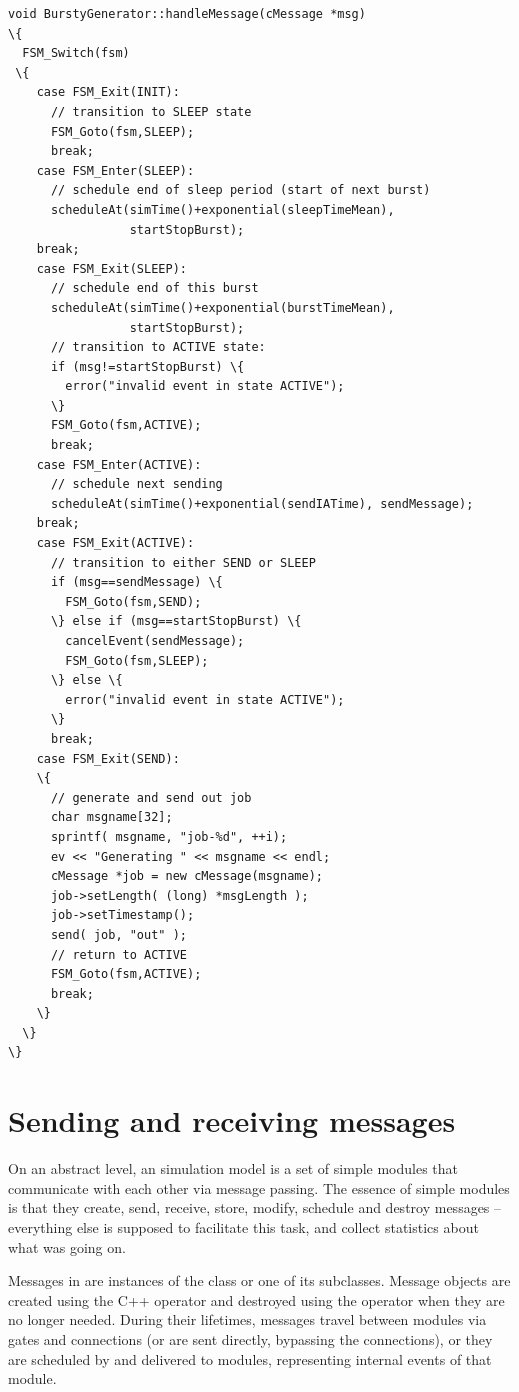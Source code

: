 \begin{Verbatim}[commandchars=\\\{\}]
void BurstyGenerator::handleMessage(cMessage *msg)
\{
  FSM_Switch(fsm)
 \{
    case FSM_Exit(INIT):
      // transition to SLEEP state
      FSM_Goto(fsm,SLEEP);
      break;
    case FSM_Enter(SLEEP):
      // schedule end of sleep period (start of next burst)
      scheduleAt(simTime()+exponential(sleepTimeMean),
                 startStopBurst);
    break;
    case FSM_Exit(SLEEP):
      // schedule end of this burst
      scheduleAt(simTime()+exponential(burstTimeMean),
                 startStopBurst);
      // transition to ACTIVE state:
      if (msg!=startStopBurst) \{
        error("invalid event in state ACTIVE");
      \}
      FSM_Goto(fsm,ACTIVE);
      break;
    case FSM_Enter(ACTIVE):
      // schedule next sending
      scheduleAt(simTime()+exponential(sendIATime), sendMessage);
    break;
    case FSM_Exit(ACTIVE):
      // transition to either SEND or SLEEP
      if (msg==sendMessage) \{
        FSM_Goto(fsm,SEND);
      \} else if (msg==startStopBurst) \{
        cancelEvent(sendMessage);
        FSM_Goto(fsm,SLEEP);
      \} else \{
        error("invalid event in state ACTIVE");
      \}
      break;
    case FSM_Exit(SEND):
    \{
      // generate and send out job
      char msgname[32];
      sprintf( msgname, "job-%d", ++i);
      ev << "Generating " << msgname << endl;
      cMessage *job = new cMessage(msgname);
      job->setLength( (long) *msgLength );
      job->setTimestamp();
      send( job, "out" );
      // return to ACTIVE
      FSM_Goto(fsm,ACTIVE);
      break;
    \}
  \}
\}
\end{Verbatim}





\section{Sending and receiving messages}
\label{ch:simple-modules:sending-and-receiving}

On an abstract level, an {\opp} simulation model is a set of
simple modules that communicate with each other via message passing.
The essence of simple modules is that they create, send, receive,
store, modify, schedule and destroy messages -- everything else
is supposed to facilitate this task, and collect statistics
about what was going on.

Messages in {\opp} are instances of the  class or
one of its subclasses. Message objects are created using the C++
 operator and destroyed using the  operator
when they are no longer needed. During their lifetimes,
messages travel between modules via gates and connections
(or are sent directly, bypassing the connections), or
they are scheduled by and delivered to modules,
representing internal events of that module.

